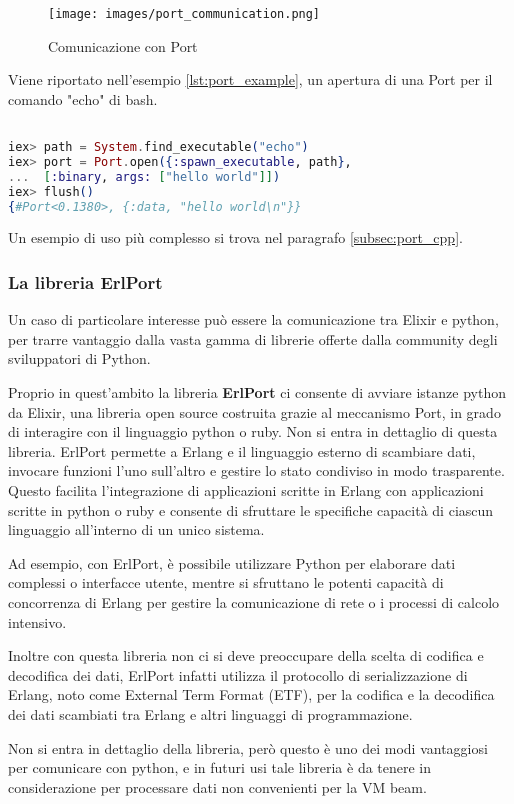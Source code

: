 \begin{figure}[!htp]
    \centering
    \texttt{[image: images/port\_communication.png]}
	\caption{Comunicazione con Port \cite{ErlangPo88:online}}
  	\label{fig:port_communication}
\end{figure}

Viene riportato nell'esempio \ref{lst:port_example},
un apertura di una Port per il comando "echo" di bash.

\begin{lstlisting}[language=elixir,captionpos=b
	caption={Comando echo con Port},label={lst:port_example}]

iex> path = System.find_executable("echo")
iex> port = Port.open({:spawn_executable, path},
...  [:binary, args: ["hello world"]])
iex> flush()
{#Port<0.1380>, {:data, "hello world\n"}}	
\end{lstlisting}

Un esempio di uso più complesso si trova nel paragrafo \ref{subsec:port_cpp}.
\subsubsection{La libreria ErlPort}
Un caso di particolare interesse può essere la comunicazione
tra Elixir e python, per 
trarre vantaggio dalla vasta gamma di librerie offerte dalla
community degli sviluppatori di Python.

Proprio in quest'ambito la libreria \textbf{ErlPort} ci consente
di avviare istanze python da Elixir, una libreria open source
costruita grazie al meccanismo Port, in grado di interagire con
il linguaggio python o ruby. Non si entra in dettaglio di
questa libreria.
ErlPort permette a Erlang e il linguaggio esterno di scambiare
dati, invocare funzioni l'uno sull'altro e gestire lo stato
condiviso in modo trasparente.
Questo facilita l'integrazione di applicazioni scritte in
Erlang con applicazioni scritte in python o ruby e consente di
sfruttare le specifiche capacità di ciascun linguaggio
all'interno di un unico sistema.

Ad esempio, con ErlPort, è possibile utilizzare Python
per elaborare dati complessi o interfacce utente,
mentre si sfruttano le potenti capacità di concorrenza di
Erlang per gestire la comunicazione di rete o i
processi di calcolo intensivo.

Inoltre con questa libreria non ci si deve preoccupare
della scelta di codifica e decodifica dei dati, ErlPort
infatti utilizza il protocollo di serializzazione di Erlang,
noto come External Term Format (ETF), per la codifica e
la decodifica dei dati scambiati tra Erlang e altri
linguaggi di programmazione.

Non si entra in dettaglio della libreria, però questo è
uno dei modi vantaggiosi per comunicare con python, e
in futuri usi tale libreria è da tenere in considerazione per
processare dati non convenienti per la VM beam.



